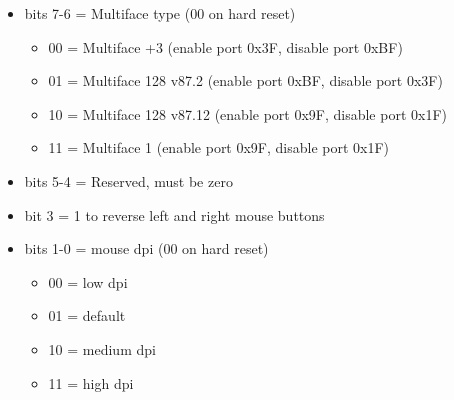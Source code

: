 \begin{itemize}
\item bits 7-6 = Multiface type (00 on hard reset)
  \begin{itemize}
  \item 00 = Multiface +3 (enable port 0x3F, disable port 0xBF)
  \item 01 = Multiface 128 v87.2 (enable port 0xBF, disable port 0x3F)
  \item 10 = Multiface 128 v87.12 (enable port 0x9F, disable port 0x1F)
  \item 11 = Multiface 1 (enable port 0x9F, disable port 0x1F)
  \end{itemize}
\item bits 5-4 = Reserved, must be zero
\item bit 3 = 1 to reverse left and right mouse buttons
\item bits 1-0 = mouse dpi (00 on hard reset)
  \begin{itemize}
  \item 00 = low dpi
  \item 01 = default
  \item 10 = medium dpi
  \item 11 = high dpi
  \end{itemize}
\end{itemize}

